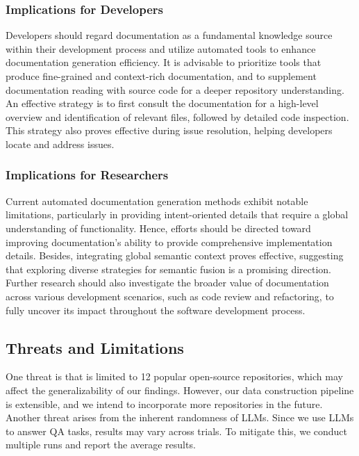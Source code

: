 \subsubsection{Implications for Developers}
Developers should regard documentation as a fundamental knowledge source within their development process and utilize automated tools to enhance documentation generation efficiency. It is advisable to prioritize tools that produce fine-grained and context-rich documentation, and to supplement documentation reading with source code for a deeper repository understanding. An effective strategy is to first consult the documentation for a high-level overview and identification of relevant files, followed by detailed code inspection. This strategy also proves effective during issue resolution, helping developers locate and address issues.

\subsubsection{Implications for Researchers}
Current automated documentation generation methods exhibit notable limitations, particularly in providing intent-oriented details that require a global understanding of functionality. Hence, efforts should be directed toward improving documentation’s ability to provide comprehensive implementation details. Besides, integrating global semantic context proves effective, suggesting that exploring diverse strategies for semantic fusion is a promising direction. Further research should also investigate the broader value of documentation across various development scenarios, such as code review and refactoring, to fully uncover its impact throughout the software development process.


\subsection{Threats and Limitations}
One threat is that \benchmark is limited to 12 popular open-source repositories, which may affect the generalizability of our findings. However, our data construction pipeline is extensible, and we intend to incorporate more repositories in the future. Another threat arises from the inherent randomness of LLMs. Since we use LLMs to answer QA tasks, results may vary across trials. To mitigate this, we conduct multiple runs and report the average results.



